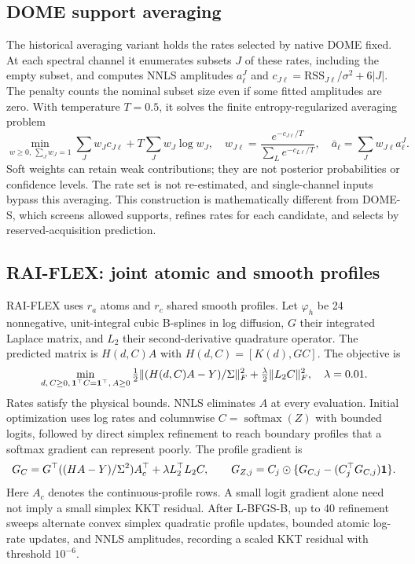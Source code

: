 \subsection{DOME support averaging}\label{app:domeaverage}
The historical averaging variant holds the rates selected by native DOME fixed. At each spectral channel it enumerates subsets $J$ of these rates, including the empty subset, and computes NNLS amplitudes $a^{J}_\ell$ and $c_{J\ell}=\mathrm{RSS}_{J\ell}/\sigma^2+6|J|$. The penalty counts the nominal subset size even if some fitted amplitudes are zero. With temperature $T=0.5$, it solves the finite entropy-regularized averaging problem
\begin{equation}\label{eq:domeaverage}
 \min_{w\geq0,\,\sum_Jw_J=1}\sum_Jw_Jc_{J\ell}+T\sum_Jw_J\log w_J,
 \quad w_{J\ell}=\frac{e^{-c_{J\ell}/T}}{\sum_Le^{-c_{L\ell}/T}},\quad
 \bar a_\ell=\sum_Jw_{J\ell}a^J_\ell.
\end{equation}
Soft weights can retain weak contributions; they are not posterior probabilities or confidence levels. The rate set is not re-estimated, and single-channel inputs bypass this averaging. This construction is mathematically different from DOME-S, which screens allowed supports, refines rates for each candidate, and selects by reserved-acquisition prediction.

\subsection{RAI-FLEX: joint atomic and smooth profiles}\label{app:raiflex}
RAI-FLEX uses $r_a$ atoms and $r_c$ shared smooth profiles. Let $\varphi_h$ be 24 nonnegative, unit-integral cubic B-splines in log diffusion, $G$ their integrated Laplace matrix, and $L_2$ their second-derivative quadrature operator. The predicted matrix is $H(d,C)A$ with $H(d,C)=[K(d),GC]$. The objective is
\begin{equation}\label{eq:raiflex}
 \min_{d,\,C\geq0,\,\mathbf{1}^\top C=\mathbf{1}^\top,\,A\geq0}
 \tfrac12\|(H(d,C)A-Y)/\Sigma\|_F^2+\tfrac\lambda2\|L_2C\|_F^2,
 \quad \lambda=0.01.
\end{equation}
Rates satisfy the physical bounds. NNLS eliminates $A$ at every evaluation. Initial optimization uses log rates and columnwise $C=\operatorname{softmax}(Z)$ with bounded logits, followed by direct simplex refinement to reach boundary profiles that a softmax gradient can represent poorly. The profile gradient is
\begin{equation}\label{eq:flexgrad}
 G_C=G^\top((HA-Y)/\Sigma^2)A_c^\top+\lambda L_2^\top L_2C,
 \qquad G_{Z,j}=C_j\odot\{G_{C,j}-(C_j^\top G_{C,j})\mathbf{1}\}.
\end{equation}
Here $A_c$ denotes the continuous-profile rows. A small logit gradient alone need not imply a small simplex KKT residual. After L-BFGS-B, up to 40 refinement sweeps alternate convex simplex quadratic profile updates, bounded atomic log-rate updates, and NNLS amplitudes, recording a scaled KKT residual with threshold $10^{-6}$.

